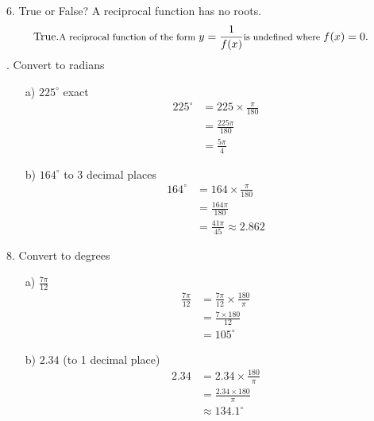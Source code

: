 \documentclass{article}
\newenvironment{solution}{\color{solutioncolor}}{}
\newcommand{\smalltext}[1]{\text{\footnotesize #1}}
\begin{document}
6. True or False? A reciprocal function has no roots.
\begin{solution}
    \begin{align*}
    &\text{True.} \smalltext{ A reciprocal function of the form } y = \frac{1}{f(x)} \smalltext{ is undefined where } f(x) = 0.
\end{align*}
\end{solution}
. Convert to radians
\begin{enumerate}
    \item[a)] \( 225^{\circ} \) exact
    \begin{solution}
    \begin{align*}
        225^{\circ} &= 225 \times \frac{\pi}{180} \\
        &= \frac{225\pi}{180} \\
        &= \frac{5\pi}{4}
    \end{align*}
    \end{solution}
    \item[b)] \( 164^{\circ} \) to 3 decimal places
    \begin{solution}
    \begin{align*}
        164^{\circ} &= 164 \times \frac{\pi}{180} \\
        &= \frac{164\pi}{180} \\
        &= \frac{41\pi}{45} \approx 2.862
    \end{align*}
    \end{solution}
\end{enumerate}

8. Convert to degrees
\begin{enumerate}
    \item[a)] \( \frac{7\pi}{12} \)
    \begin{solution}
    \begin{align*}
        \frac{7\pi}{12} &= \frac{7\pi}{12} \times \frac{180}{\pi} \\
        &= \frac{7 \times 180}{12} \\
        &= 105^{\circ}
    \end{align*}
        \end{solution}

    \item[b)] \( 2.34 \) (to 1 decimal place)
    \begin{solution}
    \begin{align*}
        2.34 &= 2.34 \times \frac{180}{\pi} \\
        &= \frac{2.34 \times 180}{\pi} \\
        &\approx 134.1^{\circ}
    \end{align*}
    \end{solution}

\end{enumerate}
\end{document}
